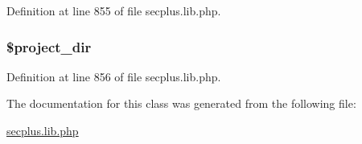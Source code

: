 Definition at line 855 of file secplus.lib.php.

\hypertarget{class_sec_plus_1_1_shell_cmd_a3f36281fff00b24d2d26e08841d336d9}{
\subsubsection[{\$project\_\-dir}]{\setlength{\rightskip}{0pt plus 5cm}\$project\_\-dir}}
\label{class_sec_plus_1_1_shell_cmd_a3f36281fff00b24d2d26e08841d336d9}


Definition at line 856 of file secplus.lib.php.



The documentation for this class was generated from the following file:\begin{DoxyCompactItemize}
\item 
\hyperlink{secplus_8lib_8php}{secplus.lib.php}\end{DoxyCompactItemize}
